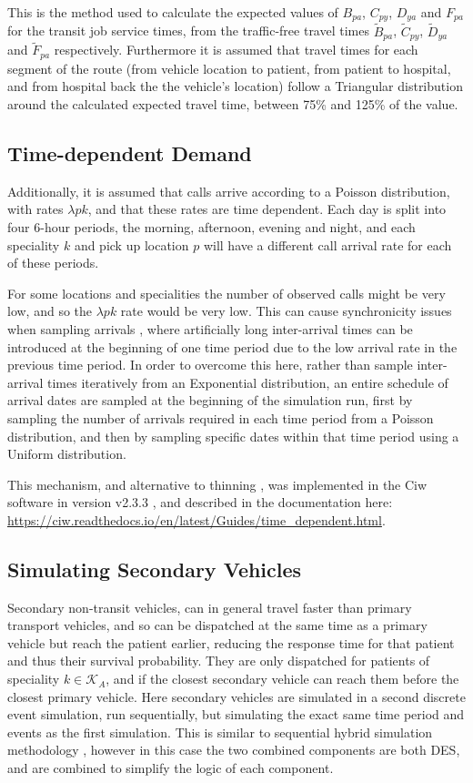 \documentclass[preprint,12pt]{elsarticle}
\begin{document}
This is the method used to calculate the expected values of $B_{pa}$,
$C_{py}$, $D_{ya}$ and $F_{pa}$ for the transit job service times, from the
traffic-free travel times $\tilde{B}_{pa}$, $\tilde{C}_{py}$, $\tilde{D}_{ya}$
and $\tilde{F}_{pa}$ respectively.
Furthermore it is assumed that travel times for each segment of the route
(from vehicle location to patient, from patient to hospital, and from hospital
back the the vehicle's location) follow a Triangular distribution around the
calculated expected travel time, between 75\% and 125\% of the value.


\subsection{Time-dependent Demand}
Additionally, it is assumed that calls arrive according to a Poisson
distribution, with rates $\lambda{pk}$, and that these rates are time
dependent. Each day is split into four 6-hour periods, the morning, afternoon,
evening and night, and each speciality $k$ and pick up location $p$ will have
a different call arrival rate for each of these periods.

For some locations and specialities the number of observed calls might be very
low, and so the $\lambda{pk}$ rate would be very low. This can cause
synchronicity issues when sampling arrivals \citep{pidd2004computer}, where
artificially long inter-arrival times can be introduced at the beginning of
one time period due to the low arrival rate in the previous time period.
In order to overcome this here, rather than sample inter-arrival times
iteratively from an Exponential distribution, an entire schedule of arrival
dates are sampled at the beginning of the simulation run, first by sampling
the number of arrivals required in each time period from a Poisson
distribution, and then by sampling specific dates within that time period
using a Uniform distribution.

This mechanism, and alternative to thinning \cite{lewisshedler79}, was
implemented in the Ciw software in version v2.3.3 \cite{ciw233}, and described
in the documentation here:
\url{https://ciw.readthedocs.io/en/latest/Guides/time_dependent.html}.


\subsection{Simulating Secondary Vehicles}\label{sec:simulation_secondary}
Secondary non-transit vehicles, can in general travel faster than primary
transport vehicles, and so can be dispatched at the same time as a primary
vehicle but reach the patient earlier, reducing the response time for that
patient and thus their survival probability. They are only dispatched for
patients of speciality $k \in \mathcal{K}_A$, and if the closest secondary
vehicle can reach them before the closest primary vehicle.
Here secondary vehicles are simulated in a second discrete event simulation,
run sequentially, but simulating the exact same time period and events as the
first simulation. This is similar to sequential hybrid simulation methodology
\cite{brailsfordetal19, morganetal17}, however in this case the two combined
components are both DES, and are combined to simplify the logic of each
component.
\end{document}
